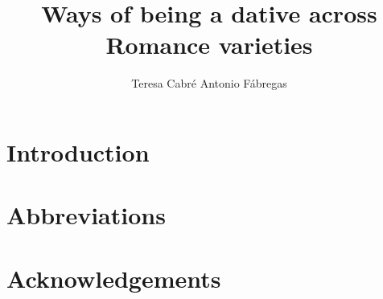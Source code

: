\documentclass[output=paper]{langsci/langscibook}
\author{Teresa Cabré\affiliation{}\lastand
Antonio Fábregas\affiliation{}}
\title{Ways of being a dative across Romance varieties}
\begin{document}
\section{Introduction}  
 
\section*{Abbreviations}
\section*{Acknowledgements}

\sloppy
\printbibliography[heading=subbibliography,notkeyword=this] 
\end{document}
